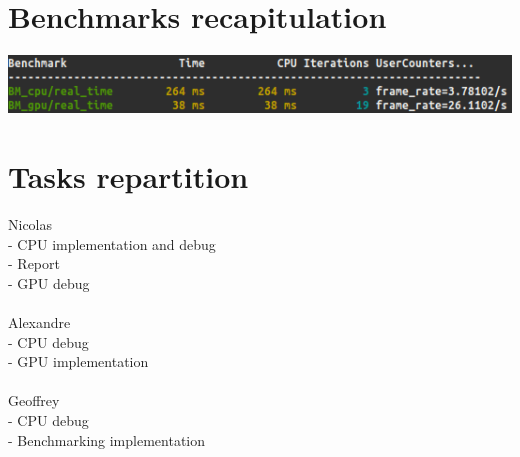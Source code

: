 \documentclass{article}
\begin{document}
\section{Benchmarks recapitulation}

\begin{center}
    \includegraphics[width=1\textwidth]{pics/benchmark02.png}
\end{center}


\section{Tasks repartition}

\noindent
Nicolas\\
- CPU implementation and debug\\
- Report\\
- GPU debug\\
\\
Alexandre\\
- CPU debug\\
- GPU implementation\\
\\
Geoffrey\\
- CPU debug\\
- Benchmarking implementation
\end{document}
